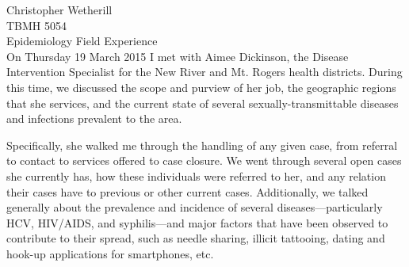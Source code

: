 \documentclass[11pt,letterpaper,final] {article}
\begin{document}

\noindent Christopher Wetherill \\
TBMH 5054 \\
Epidemiology Field Experience \\[0.2cm]

On Thursday 19 March 2015 I met with Aimee Dickinson, the Disease Intervention Specialist for the New River and Mt. Rogers health districts. During this time, we discussed the scope and purview of her job, the geographic regions that she services, and the current state of several sexually-transmittable diseases and infections prevalent to the area.

Specifically, she walked me through the handling of any given case, from referral to contact to services offered to case closure. We went through several open cases she currently has, how these individuals were referred to her, and any relation their cases have to previous or other current cases. Additionally, we talked generally about the prevalence and incidence of several diseases---particularly HCV, HIV/AIDS, and syphilis---and major factors that have been observed to contribute to their spread, such as needle sharing, illicit tattooing, dating and hook-up applications for smartphones, etc.


% 
% 
\end{document}
